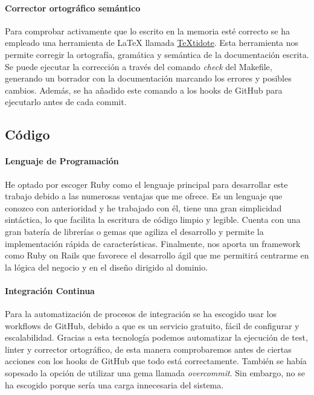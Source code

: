 \paragraph*{Corrector ortográfico semántico}
Para comprobar activamente que lo escrito en la memoria esté correcto se ha empleado una herramienta de LaTeX llamada \href{https://github.com/sylvainhalle/textidote}{TeXtidote}.
Esta herramienta nos permite corregir la ortografía, gramática y semántica de la documentación escrita. Se puede ejecutar la corrección a través del comando \textit{check} del Makefile,
generando un borrador con la documentación marcando los errores y posibles cambios. Además, se ha añadido este comando a los hooks de GitHub para ejecutarlo antes de cada commit.

\subsection{Código}

\paragraph*{Lenguaje de Programación}
He optado por escoger Ruby como el lenguaje principal para desarrollar este trabajo debido a las numerosas ventajas que me ofrece.
Es un lenguaje que conozco con anterioridad y he trabajado con él, tiene una gran simplicidad sintáctica, lo que facilita
la escritura de código limpio y legible. Cuenta con una gran batería de librerías o gemas que agiliza el desarrollo y permite la
implementación rápida de características. Finalmente, nos aporta un framework como Ruby on Rails que favorece el desarrollo ágil que
me permitirá centrarme en la lógica del negocio y en el diseño dirigido al dominio.

\paragraph*{Integración Continua}
Para la automatización de procesos de integración se ha escogido usar los workflows de GitHub, debido a que es un servicio gratuito, fácil de configurar y escalabilidad.
Gracias a esta tecnología podemos automatizar la ejecución de test, linter y corrector ortográfico, de esta manera comprobaremos antes de ciertas acciones con los hooks de GitHub que todo está
correctamente. También se había sopesado la opción de utilizar una gema llamada \textit{overcommit}. Sin embargo, no se ha escogido porque sería una carga innecesaria del sistema.


